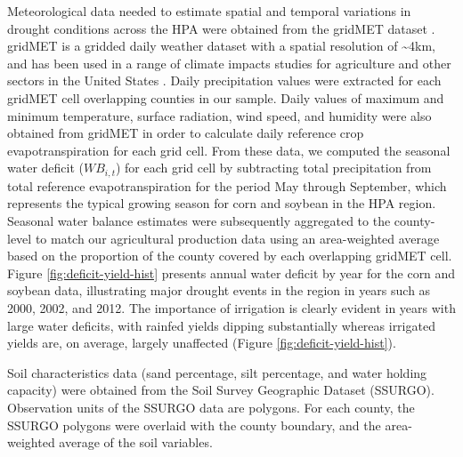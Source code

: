 \documentclass[
]{article}
\begin{document}
Meteorological data needed to estimate spatial and temporal variations in drought conditions across the HPA were obtained from the gridMET dataset \citep{Abatzoglou2013}. gridMET is a gridded daily weather dataset with a spatial resolution of \textasciitilde4km, and has been used in a range of climate impacts studies for agriculture and other sectors in the United States \citep{abatzoglou2016impact, pereira2015crop, crane2018machine, venkatappa2021impacts, zhu2019dissecting}. Daily precipitation values were extracted for each gridMET cell overlapping counties in our sample. Daily values of maximum and minimum temperature, surface radiation, wind speed, and humidity were also obtained from gridMET in order to calculate daily reference crop evapotranspiration for each grid cell. From these data, we computed the seasonal water deficit (\(WB_{i,t}\)) for each grid cell by subtracting total precipitation from total reference evapotranspiration for the period May through September, which represents the typical growing season for corn and soybean in the HPA region. Seasonal water balance estimates were subsequently aggregated to the county-level to match our agricultural production data using an area-weighted average based on the proportion of the county covered by each overlapping gridMET cell. Figure \ref{fig:deficit-yield-hist} presents annual water deficit by year for the corn and soybean data, illustrating major drought events in the region in years such as 2000, 2002, and 2012. The importance of irrigation is clearly evident in years with large water deficits, with rainfed yields dipping substantially whereas irrigated yields are, on average, largely unaffected (Figure \ref{fig:deficit-yield-hist}).

Soil characteristics data (sand percentage, silt percentage, and water holding capacity) were obtained from the Soil Survey Geographic
Dataset (SSURGO). Observation units of the SSURGO data are polygons. For each county, the SSURGO polygons were overlaid with the county boundary, and the area-weighted average of the soil variables.
\end{document}
